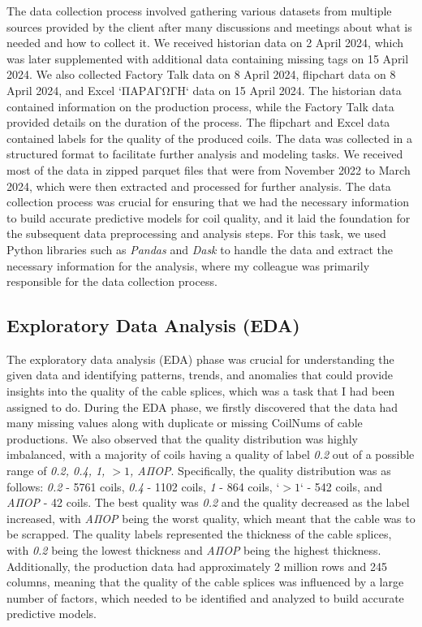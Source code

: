 The data collection process involved gathering various datasets from multiple
sources provided by the client after many discussions and meetings about what
is needed and how to collect it. We received historian data on 2 April 2024,
which was later supplemented with additional data containing missing tags on 15
April 2024. We also collected Factory Talk data on 8 April 2024, flipchart data
on 8 April 2024, and Excel `ΠΑΡΑΓΩΓΗ` data on 15 April 2024. The historian data
contained information on the production process, while the Factory Talk data
provided details on the duration of the process. The flipchart and Excel data
contained labels for the quality of the produced coils. The data was collected
in a structured format to facilitate further analysis and modeling tasks. We
received most of the data in zipped parquet files that were from November 2022
to March 2024, which were then extracted and processed for further analysis.
The data collection process was crucial for ensuring that we had the necessary
information to build accurate predictive models for coil quality, and it laid
the foundation for the subsequent data preprocessing and analysis steps. For
this task, we used Python libraries such as \emph{Pandas} and \emph{Dask} to
handle the data and extract the necessary information for the analysis, where
my colleague was primarily responsible for the data collection process.

\subsection{Exploratory Data Analysis (EDA)}

The exploratory data analysis (EDA) phase was crucial for understanding the
given data and identifying patterns, trends, and anomalies that could provide
insights into the quality of the cable splices, which was a task that I had
been assigned to do. During the EDA phase, we firstly discovered that the data
had many missing values along with duplicate or missing CoilNums of cable
productions. We also observed that the quality distribution was highly
imbalanced, with a majority of coils having a quality of label \emph{0.2} out
of a possible range of \emph{0.2, 0.4, 1, $>1$, ΑΠΟΡ}. Specifically, the
quality distribution was as follows: \emph{0.2} - 5761 coils, \emph{0.4} - 1102
coils, \emph{1} - 864 coils, `\emph{$>1$}` - 542 coils, and \emph{ΑΠΟΡ} - 42
coils. The best quality was \emph{0.2} and the quality decreased as the label
increased, with \emph{ΑΠΟΡ} being the worst quality, which meant that the cable
was to be scrapped. The quality labels represented the thickness of the cable
splices, with \emph{0.2} being the lowest thickness and \emph{ΑΠΟΡ} being the
highest thickness. Additionally, the production data had approximately 2
million rows and 245 columns, meaning that the quality of the cable splices was
influenced by a large number of factors, which needed to be identified and
analyzed to build accurate predictive models.

